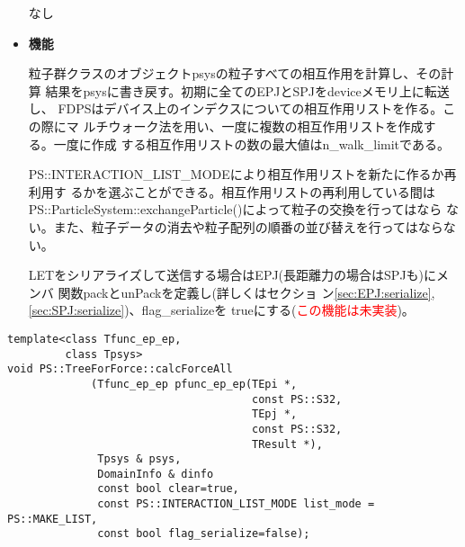 \begin{itemize}
なし

\item {\bf 機能}

粒子群クラスのオブジェクトpsysの粒子すべての相互作用を計算し、その計算
結果をpsysに書き戻す。初期に全てのEPJとSPJをdeviceメモリ上に転送し、
FDPSはデバイス上のインデクスについての相互作用リストを作る。この際にマ
ルチウォーク法を用い、一度に複数の相互作用リストを作成する。一度に作成
する相互作用リストの数の最大値はn\_walk\_limitである。

PS::INTERACTION\_LIST\_MODEにより相互作用リストを新たに作るか再利用す
るかを選ぶことができる。相互作用リストの再利用している間は
PS::ParticleSystem::exchangeParticle()によって粒子の交換を行ってはなら
ない。また、粒子データの消去や粒子配列の順番の並び替えを行ってはならな
い。

LETをシリアライズして送信する場合はEPJ(長距離力の場合はSPJも)にメンバ
関数packとunPackを定義し(詳しくはセクショ
ン\ref{sec:EPJ:serialize},\ref{sec:SPJ:serialize})、flag\_serializeを
trueにする(\textcolor{red}{この機能は未実装})。

\end{itemize}



\begin{screen}
\begin{verbatim}
template<class Tfunc_ep_ep,
         class Tpsys>
void PS::TreeForForce::calcForceAll
             (Tfunc_ep_ep pfunc_ep_ep(TEpi *,
                                      const PS::S32,
                                      TEpj *,
                                      const PS::S32,
                                      TResult *),
              Tpsys & psys,
              DomainInfo & dinfo
              const bool clear=true,
              const PS::INTERACTION_LIST_MODE list_mode = PS::MAKE_LIST,
              const bool flag_serialize=false);
\end{verbatim}
\end{screen}

